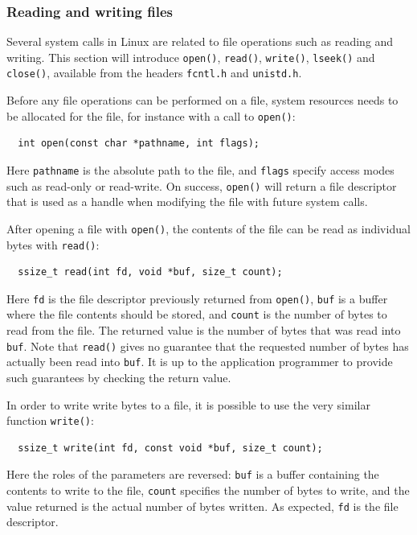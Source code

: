 \subsubsection{Reading and writing files}\label{sec:reading-and-writing-files}
Several system calls in Linux are related to file operations such as reading and writing. This section will introduce \texttt{open()}, \texttt{read()}, \texttt{write()}, \texttt{lseek()} and \texttt{close()}, available from the headers \texttt{fcntl.h} and \texttt{unistd.h}.

Before any file operations can be performed on a file, system resources needs to be allocated for the file, for instance with a call to \texttt{open()}:
\begin{verbatim}
  int open(const char *pathname, int flags);
\end{verbatim}
Here \texttt{pathname} is the absolute path to the file, and \texttt{flags} specify access modes such as read-only or read-write. On success, \texttt{open()} will return a file descriptor that is used as a handle when modifying the file with future system calls.

After opening a file with \texttt{open()}, the contents of the file can be read as individual bytes with \texttt{read()}:
\begin{verbatim}
  ssize_t read(int fd, void *buf, size_t count);
\end{verbatim}
Here \texttt{fd} is the file descriptor previously returned from \texttt{open()}, \texttt{buf} is a buffer where the file contents should be stored, and \texttt{count} is the number of bytes to read from the file. The returned value is the number of bytes that was read into \texttt{buf}. Note that \texttt{read()} gives no guarantee that the requested number of bytes has actually been read into \texttt{buf}. It is up to the application programmer to provide such guarantees by checking the return value.

In order to write write bytes to a file, it is possible to use the very similar function \texttt{write()}:
\begin{verbatim}
  ssize_t write(int fd, const void *buf, size_t count);
\end{verbatim}
Here the roles of the parameters are reversed: \texttt{buf} is a buffer containing the contents to write to the file, \texttt{count} specifies the number of bytes to write, and the value returned is the actual number of bytes written. As expected, \texttt{fd} is the file descriptor.

